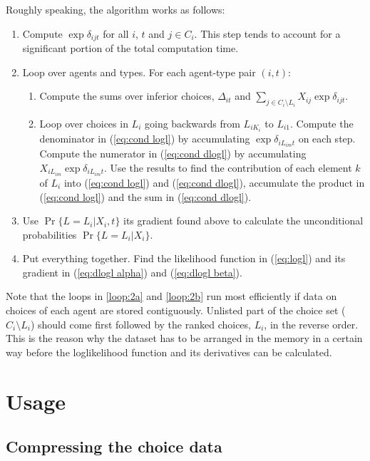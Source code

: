\documentclass[12pt]{article}
\begin{document}
Roughly speaking, the algorithm works as follows:
\begin{enumerate}
	\item{}Compute $\exp\delta_{ijt}$ for all $i$, $t$ and $j\in C_i$. This step tends to account for a significant portion of the total computation time.
	\item{}Loop over agents and types. For each agent-type pair $(i,t)$:
	\begin{enumerate}
		\item\label{loop:2a} Compute the sums over inferior choices, $\Delta_{it}$ and  $\sum_{j\in{C_i\setminus{L_i}}}X_{ij}\exp{\delta_{ijt}}$.
		\item\label{loop:2b} Loop over choices in $L_i$ going backwards from $L_{iK_i}$ to $L_{i1}$. Compute the denominator in (\ref{eq:cond logl}) by accumulating $\exp\delta_{iL_{im}t}$ on each step. Compute the numerator in (\ref{eq:cond dlogl}) by accumulating $X_{iL_{im}}\exp\delta_{iL_{im}t}$. Use the results to find the contribution of each element $k$ of $L_i$ into (\ref{eq:cond logl}) and (\ref{eq:cond dlogl}), accumulate the product in (\ref{eq:cond logl}) and the sum in (\ref{eq:cond dlogl}).
		 
	\end{enumerate}
	\item{}Use $\Pr\{L=L_i|X_i,t\}$ its gradient found above to calculate the unconditional probabilities $\Pr\{L=L_i|X_i\}$.
	\item Put everything together. Find the likelihood function in (\ref{eq:logl}) and its gradient in (\ref{eq:dlogl alpha}) and (\ref{eq:dlogl beta}).
\end{enumerate}
Note that the loops in \ref{loop:2a} and \ref{loop:2b} run most efficiently if data on choices of each agent are stored contiguously. Unlisted part of the choice set ($C_i\setminus L_i$) should come first followed by the ranked choices, $L_i$, in the reverse order. This is the reason why the dataset has to be arranged in the memory in a certain way before the loglikelihood function and its derivatives can be calculated.


\section{Usage}

\subsection{Compressing the choice data}
\end{document}
